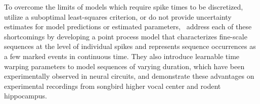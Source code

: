\documentclass[brainsci, %
               review,submit,pdftex,moreauthors%
               ]{Definitions/mdpi}
\begin{document}

To overcome the limits of models which require spike times to be discretized, utilize a suboptimal least-squares criterion, or do not provide uncertainty estimates for model predictions or estimated parameters,~\citep{williams_point_2020} address each of these shortcomings by developing a point process model that characterizes fine-scale sequences at the level of individual spikes and represents sequence occurrences as a few marked events in continuous time. They also introduce learnable time warping parameters to model sequences of varying duration, which have been experimentally observed in neural circuits, and demonstrate these advantages on experimental recordings from songbird higher vocal center and rodent hippocampus.

\end{document}
